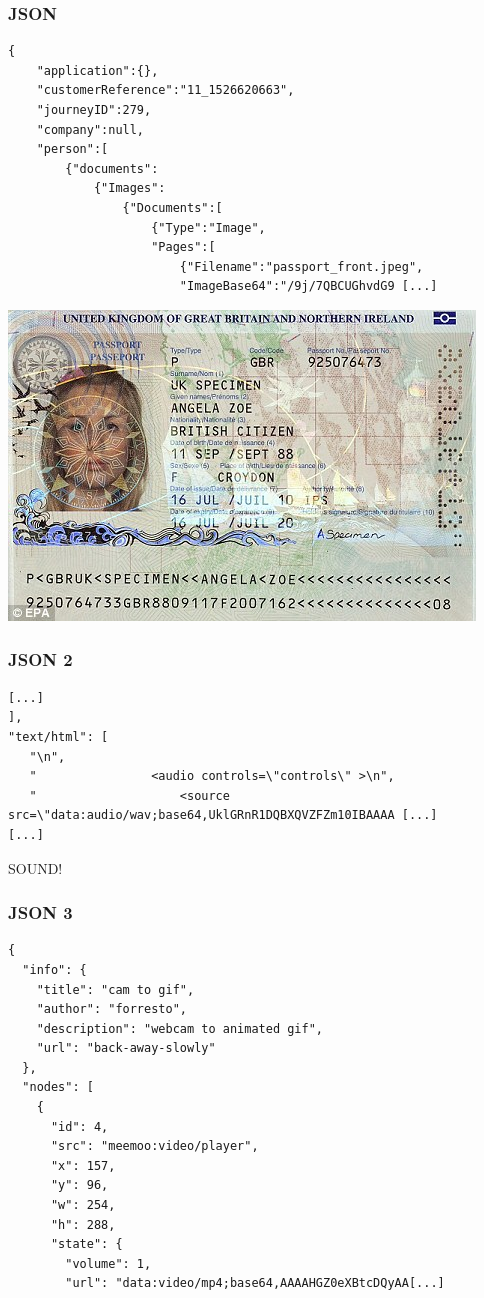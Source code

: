 \begin{frame}[fragile]
\frametitle{JSON}
\begin{lstlisting}
{
    "application":{},
    "customerReference":"11_1526620663",
    "journeyID":279,
    "company":null,
    "person":[
        {"documents":
            {"Images":
                {"Documents":[
                    {"Type":"Image",
                    "Pages":[
                        {"Filename":"passport_front.jpeg",
                        "ImageBase64":"/9j/7QBCUGhvdG9 [...]
\end{lstlisting}
\end{frame}

\begin{frame}
    \centering
    \includegraphics[width=0.7\linewidth]{pics/json.jpeg}
\end{frame}


\begin{frame}[fragile]
\frametitle{JSON 2}
\begin{lstlisting}
[...]
],
"text/html": [
   "\n",
   "                <audio controls=\"controls\" >\n",
   "                    <source src=\"data:audio/wav;base64,UklGRnR1DQBXQVZFZm10IBAAAA [...]
[...]
\end{lstlisting}
\end{frame}

\begin{frame}
    \centering
    \begin{LARGE}
        SOUND!
    \end{LARGE}
\end{frame}


\begin{frame}[fragile]
\frametitle{JSON 3}
\begin{lstlisting}
{
  "info": {
    "title": "cam to gif",
    "author": "forresto",
    "description": "webcam to animated gif",
    "url": "back-away-slowly"
  },
  "nodes": [
    {
      "id": 4,
      "src": "meemoo:video/player",
      "x": 157,
      "y": 96,
      "w": 254,
      "h": 288,
      "state": {
        "volume": 1,
        "url": "data:video/mp4;base64,AAAAHGZ0eXBtcDQyAA[...]

\end{lstlisting}
\end{frame}

